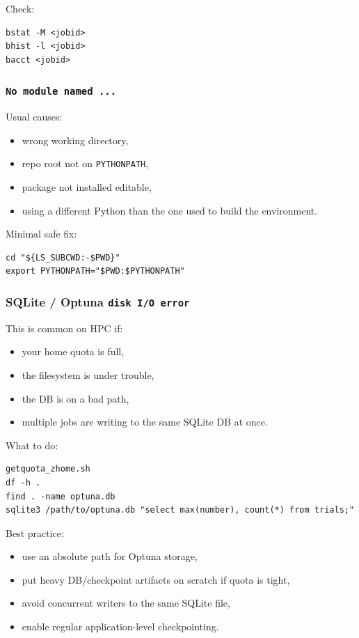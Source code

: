 \documentclass[11pt,a4paper]{article}
\begin{document}
Check:
\begin{lstlisting}[style=shell]
bstat -M <jobid>
bhist -l <jobid>
bacct <jobid>
\end{lstlisting}

\subsubsection{\texttt{No module named ...}}

Usual causes:
\begin{itemize}[leftmargin=1.5em]
  \item wrong working directory,
  \item repo root not on \texttt{PYTHONPATH},
  \item package not installed editable,
  \item using a different Python than the one used to build the environment.
\end{itemize}

Minimal safe fix:
\begin{lstlisting}[style=shell]
cd "${LS_SUBCWD:-$PWD}"
export PYTHONPATH="$PWD:$PYTHONPATH"
\end{lstlisting}

\subsubsection{SQLite / Optuna \texttt{disk I/O error}}

This is common on HPC if:
\begin{itemize}[leftmargin=1.5em]
  \item your home quota is full,
  \item the filesystem is under trouble,
  \item the DB is on a bad path,
  \item multiple jobs are writing to the same SQLite DB at once.
\end{itemize}

What to do:
\begin{lstlisting}[style=shell]
getquota_zhome.sh
df -h .
find . -name optuna.db
sqlite3 /path/to/optuna.db "select max(number), count(*) from trials;"
\end{lstlisting}

Best practice:
\begin{itemize}[leftmargin=1.5em]
  \item use an absolute path for Optuna storage,
  \item put heavy DB/checkpoint artifacts on scratch if quota is tight,
  \item avoid concurrent writers to the same SQLite file,
  \item enable regular application-level checkpointing.
\end{itemize}
\end{document}
